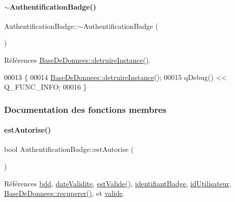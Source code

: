 \paragraph{\texorpdfstring{$\sim$\+Authentification\+Badge()}{~AuthentificationBadge()}}
{\footnotesize\ttfamily Authentification\+Badge\+::$\sim$\+Authentification\+Badge (\begin{DoxyParamCaption}{ }\end{DoxyParamCaption})}



Références \hyperlink{class_base_de_donnees_a457401c0816b888c77ce915997545f4e}{Base\+De\+Donnees\+::detruire\+Instance()}.


\begin{DoxyCode}
00013 \{
00014     \hyperlink{class_base_de_donnees_a457401c0816b888c77ce915997545f4e}{BaseDeDonnees::detruireInstance}();
00015     qDebug() << Q\_FUNC\_INFO;
00016 \}
\end{DoxyCode}


\subsubsection{Documentation des fonctions membres}
\mbox{\label{class_authentification_badge_aceb9c5a09dddbff73cd02973913c79c1}} 
\paragraph{\texorpdfstring{est\+Autorise()}{estAutorise()}}
{\footnotesize\ttfamily bool Authentification\+Badge\+::est\+Autorise (\begin{DoxyParamCaption}{ }\end{DoxyParamCaption})}



Références \hyperlink{class_authentification_badge_a0b9c724c5bc25bf1f87443d7e6833398}{bdd}, \hyperlink{class_authentification_badge_a3ff41c56490c3cfd0322949be2338605}{date\+Validite}, \hyperlink{class_authentification_badge_af320bf9cdbb285c48cd323e0ec3ef529}{est\+Valide()}, \hyperlink{class_authentification_badge_a7120366168cbe21efd991a978922eb20}{identifiant\+Badge}, \hyperlink{class_authentification_badge_ab26f8f696e807cbffd2c50cbad465b89}{id\+Utilisateur}, \hyperlink{class_base_de_donnees_a77539baad389f5acf754cd2cd452403e}{Base\+De\+Donnees\+::recuperer()}, et \hyperlink{class_authentification_badge_a9d0df9da3663b065a3a6a7a1f37a0a69}{valide}.



